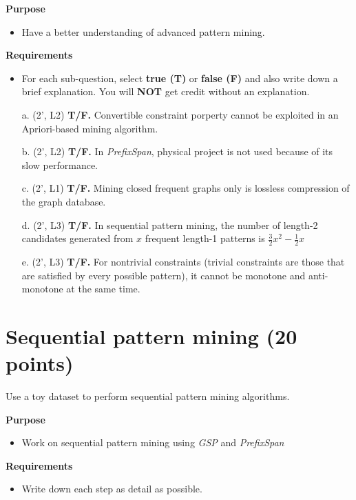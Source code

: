 \documentclass[12pt,letterpaper]{article}
\begin{document}
				\textbf{Purpose} 
				\begin{itemize}\vspace{-2mm}\setlength\itemsep{-1mm}
					\item Have a better understanding of advanced pattern mining.
				\end{itemize}
				\textbf{Requirements}
				\begin{itemize}\vspace{-2mm}\setlength\itemsep{-1mm}
					\item For each sub-question, select \textbf{true (T)} or \textbf{false (F)} and also write down a brief explanation. You will \textbf{NOT} get credit without an explanation. 
				\end{itemize}
				\begin{itemize}
					\item[a.] (2', L2) \textbf{T/F.}  Convertible constraint porperty cannot be exploited in an Apriori-based mining algorithm.
					\item[b.] (2', L2) \textbf{T/F.}  In \textit{PrefixSpan}, physical project is not used because of its slow performance.
					\item[c.] (2', L1) \textbf{T/F.}  Mining closed frequent graphs only is lossless compression of the graph database.
					\item[d.] (2', L3) \textbf{T/F.}  In sequential pattern mining, the number of length-2 candidates generated from $x$ frequent length-1 patterns is $\frac{3}{2}x^2 - \frac{1}{2}x$
					\item[e.] (2', L3) \textbf{T/F.}  For nontrivial constraints (trivial constraints are those that are satisfied by every possible pattern), it cannot be monotone and anti-monotone at the same time.
				\end{itemize}
				
				
				
				\section{Sequential pattern mining (20 points)}
				Use a toy dataset to perform sequential pattern mining algorithms.
				
				\textbf{Purpose} 
				\begin{itemize}\vspace{-2mm}\setlength\itemsep{-1mm}
					\item Work on sequential pattern mining using \textit{GSP} and \textit{PrefixSpan}
				\end{itemize}
				\textbf{Requirements}
				\begin{itemize}\vspace{-2mm}\setlength\itemsep{-1mm}
					\item Write down each step as detail as possible.
				\end{itemize}
				
\end{document}
